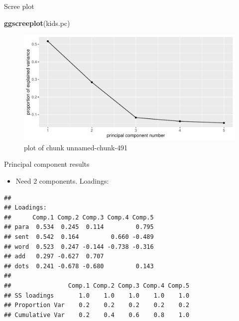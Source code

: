 \documentclass[ignorenonframetext,]{beamer}
\newenvironment{Shaded}{\begin{snugshade}}{\end{snugshade}}
\newcommand{\KeywordTok}[1]{\textcolor[rgb]{0.13,0.29,0.53}{\textbf{#1}}}
\newcommand{\NormalTok}[1]{#1}
\newcommand{\OperatorTok}[1]{\textcolor[rgb]{0.81,0.36,0.00}{\textbf{#1}}}
\providecommand{\tightlist}{%
  \setlength{\itemsep}{0pt}\setlength{\parskip}{0pt}}
\begin{document}
\begin{frame}[fragile]{Scree plot}
\protect\hypertarget{scree-plot-3}{}

\begin{Shaded}
\begin{Highlighting}[]
\KeywordTok{ggscreeplot}\NormalTok{(kids.pc)}
\end{Highlighting}
\end{Shaded}

\begin{figure}
\centering
\includegraphics{figure/unnamed-chunk-491-1.pdf}
\caption{plot of chunk unnamed-chunk-491}
\end{figure}

\end{frame}

\begin{frame}[fragile]{Principal component results}
\protect\hypertarget{principal-component-results}{}

\begin{itemize}
\tightlist
\item
  Need 2 components. Loadings:
\end{itemize}

\footnotesize

\begin{Shaded}
\end{Shaded}

\begin{verbatim}
## 
## Loadings:
##      Comp.1 Comp.2 Comp.3 Comp.4 Comp.5
## para  0.534  0.245  0.114         0.795
## sent  0.542  0.164         0.660 -0.489
## word  0.523  0.247 -0.144 -0.738 -0.316
## add   0.297 -0.627  0.707              
## dots  0.241 -0.678 -0.680         0.143
## 
##                Comp.1 Comp.2 Comp.3 Comp.4 Comp.5
## SS loadings       1.0    1.0    1.0    1.0    1.0
## Proportion Var    0.2    0.2    0.2    0.2    0.2
## Cumulative Var    0.2    0.4    0.6    0.8    1.0
\end{verbatim}

\normalsize

\end{frame}
\end{document}
